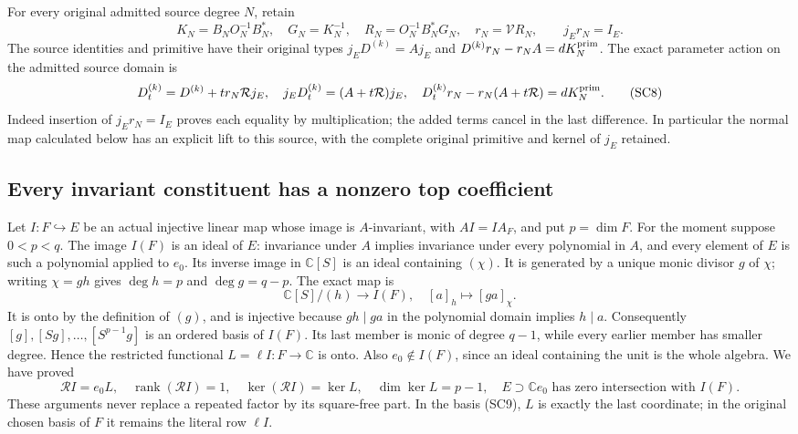 For every original admitted source degree $N$, retain
\[
 K_N=B_NO_N^{-1}B_N^*,\quad G_N=K_N^{-1},\quad
 R_N=O_N^{-1}B_N^*G_N,\quad r_N=\mathcal V R_N,
 \qquad j_Er_N=I_E.
 \tag{SC7}
\]
The source identities and primitive have their original types
$j_ED^{(k)}=Aj_E$ and
$D^{(k)}r_N-r_NA=dK_N^{\rm prim}$.
The exact parameter action on the admitted source domain is
\[
 D_t^{(k)}=D^{(k)}+t r_N\mathcal Rj_E,
 \quad j_ED_t^{(k)}=(A+t\mathcal R)j_E,
 \quad D_t^{(k)}r_N-r_N(A+t\mathcal R)=dK_N^{\rm prim}.
 \tag{SC8}
\]
Indeed insertion of $j_Er_N=I_E$ proves each equality by multiplication;
the added terms cancel in the last difference.  In particular the
normal map calculated below has an explicit lift to this source, with
the complete original primitive and kernel of $j_E$ retained.

\subsection{Every invariant constituent has a nonzero top coefficient}

Let $I:F\hookrightarrow E$ be an actual injective linear map whose
image is $A$-invariant, with $AI=IA_F$, and put $p=\dim F$.
For the moment suppose $0<p<q$.  The image $I(F)$ is an ideal of
$E$: invariance under $A$ implies invariance under every polynomial
in $A$, and every element of $E$ is such a polynomial applied to $e_0$.
Its inverse image in $\mathbb C[S]$ is an ideal containing $(\chi)$.
It is generated by a unique monic divisor $g$ of $\chi$; writing
$\chi=gh$ gives $\deg h=p$ and $\deg g=q-p$.  The exact map is
\[
 \mathbb C[S]/(h)\longrightarrow I(F),\quad [a]_h\longmapsto[ga]_\chi.
 \tag{SC9}
\]
It is onto by the definition of $(g)$, and is injective because
$gh\mid ga$ in the polynomial domain implies $h\mid a$.
Consequently $[g],[Sg],\ldots,[S^{p-1}g]$ is an ordered basis of
$I(F)$.  Its last member is monic of degree $q-1$, while every earlier
member has smaller degree.  Hence the restricted functional
$L=\ell I:F\to\mathbb C$ is onto.  Also $e_0\notin I(F)$, since an
ideal containing the unit is the whole algebra.  We have proved
\[
 \mathcal R I=e_0L,\quad \operatorname{rank}(\mathcal R I)=1,
 \quad\ker(\mathcal R I)=\ker L,\quad\dim\ker L=p-1,
 \quad E\supset\mathbb C e_0\text{ has zero intersection with }I(F).
 \tag{SC10}
\]
These arguments never replace a repeated factor by its square-free
part.  In the basis (SC9), $L$ is exactly the last coordinate; in the
original chosen basis of $F$ it remains the literal row $\ell I$.

